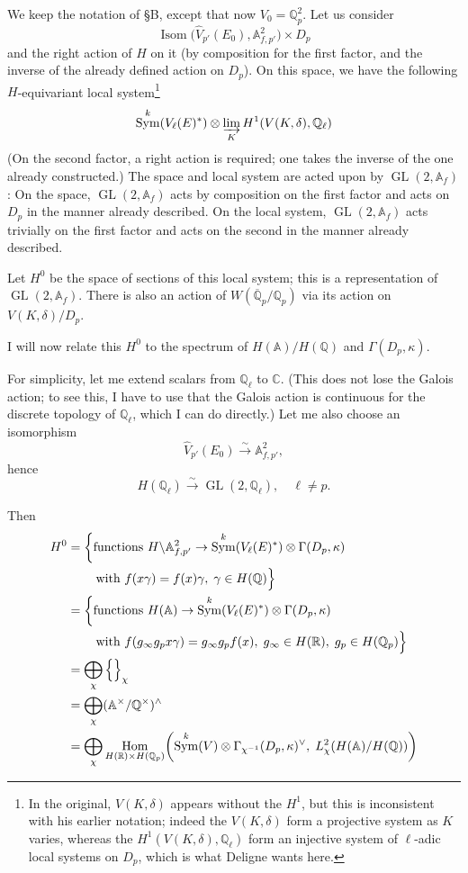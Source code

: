 \documentclass[11pt,a4paper]{article}
\theoremstyle{plain}
\theoremstyle{definition}
\theoremstyle{remark}
\DeclareMathOperator{\Hom}{Hom}
\DeclareMathOperator{\Isom}{Isom}
\DeclareMathOperator{\GL}{GL}
\DeclareMathOperator{\Sym}{Sym}
\newcommand{\A}{\mathbb{A}}
\newcommand{\C}{\mathbb{C}}
\newcommand{\Q}{\mathbb{Q}}
\newcommand{\R}{\mathbb{R}}
\newcommand{\Af}{\mathbb{A}_{f}}
\newcommand{\Qpbar}{\overline{\mathbb{Q}}_{p}}
\newcommand{\Qp}{\mathbb{Q}_{p}}
\newcommand{\Ql}{\mathbb{Q}_{\ell}}
\newcommand{\Vl}{V_{\ell}}
\begin{document}
We keep the notation of \S B, except that now $V_{0} = \Qp^{2}$. Let us consider
\[
\Isom\!\bigl(\widehat{V}_{p'}(E_{0}), \A_{f,p'}^{2}\bigr) \times D_{p}
\]
and the right action of $H$ on it (by composition for the first factor, and the inverse of the already defined action on $D_{p}$). On this space, we have the following $H$-equivariant local system\footnote{In the original, $V(K, \delta)$ appears without the $H^{1}$, but this is inconsistent with his earlier notation; indeed the $V(K, \delta)$ form a projective system as $K$ varies, whereas the $H^{1}(V(K, \delta), \Ql)$ form an injective system of $\ell$-adic local systems on $D_{p}$, which is what Deligne wants here.}
\[
\Sym^{k}(\Vl(E)^{*}) \otimes \varinjlim_{K} H^{1}(V(K, \delta), \Ql)
\]
(On the second factor, a right action is required; one takes the inverse of the one already constructed.) The space and local system are acted upon by $\GL(2, \Af)$:
On the space, $\GL(2, \Af)$ acts by composition on the first factor and acts on $D_{p}$ in the manner already described. On the local system, $\GL(2, \Af)$ acts trivially on the first factor and acts on the second in the manner already described.

Let $H^{0}$ be the space of sections of this local system; this is a representation of $\GL(2, \Af)$. There is also an action of $W(\Qpbar/\Qp)$ via its action on $V(K, \delta)/D_{p}$.

I will now relate this $H^{0}$ to the spectrum of $H(\mathbb{A})/H(\Q)$ and $\Gamma(D_{p}, \kappa)$.

For simplicity, let me extend scalars from $\Ql$ to $\C$. (This does not lose the Galois action; to see this, I have to use that the Galois action is continuous for the discrete topology of $\Ql$, which I can do directly.) Let me also choose an isomorphism
\[
\widehat{V}_{p'}(E_{0}) \xrightarrow{\sim} \A_{f,p'}^{2},
\]
hence
\[
H(\Ql) \xrightarrow{\sim} \GL(2, \Ql), \quad \ell \neq p.
\]

Then
\begin{align*}
H^{0} &= \left\{ \text{functions } H \backslash \A_{f,p'}^{2} \to \Sym^{k}(\Vl(E)^{*}) \otimes \Gamma(D_{p}, \kappa) \right. \\
&\qquad \left. \vphantom{\Big\{} \text{with } f(x\gamma) = f(x)\gamma, \; \gamma \in H(\Q) \right\} \\
&= \left\{ \text{functions } H(\mathbb{A}) \to \Sym^{k}(\Vl(E)^{*}) \otimes \Gamma(D_{p}, \kappa) \right. \\
&\qquad \left. \vphantom{\Big\{} \text{with } f(g_{\infty} g_{p} x \gamma) = g_{\infty} g_{p} f(x), \; g_{\infty} \in H(\R), \; g_{p} \in H(\Qp) \right\} \\
&= \bigoplus_{\chi} \left\{ \vphantom{\Big\{} \right\}_{\chi} \\
&= \bigoplus_{\chi} (\mathbb{A}^{\times}/\Q^{\times})^{\wedge} \\
&= \bigoplus_{\chi} \Hom_{H(\R) \times H(\Qp)}\!\left(\Sym^{k}(V) \otimes \Gamma_{\chi^{-1}}(D_{p}, \kappa)^{\vee}, \; L^{2}_{\chi}(H(\mathbb{A})/H(\Q))\right)
\end{align*}
\end{document}
